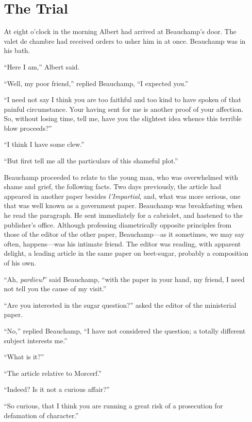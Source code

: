 \chapter{The Trial}

At eight o’clock in the morning Albert had arrived at Beauchamp’s door.
The valet de chambre had received orders to usher him in at once.
Beauchamp was in his bath.

“Here I am,” Albert said.

“Well, my poor friend,” replied Beauchamp, “I expected you.”

“I need not say I think you are too faithful and too kind to have
spoken of that painful circumstance. Your having sent for me is another
proof of your affection. So, without losing time, tell me, have you the
slightest idea whence this terrible blow proceeds?”

“I think I have some clew.”

“But first tell me all the particulars of this shameful plot.”

Beauchamp proceeded to relate to the young man, who was overwhelmed
with shame and grief, the following facts. Two days previously, the
article had appeared in another paper besides \textit{ l’Impartial}, and, what
was more serious, one that was well known as a government paper.
Beauchamp was breakfasting when he read the paragraph. He sent
immediately for a cabriolet, and hastened to the publisher’s office.
Although professing diametrically opposite principles from those of the
editor of the other paper, Beauchamp—as it sometimes, we may say often,
happens—was his intimate friend. The editor was reading, with apparent
delight, a leading article in the same paper on beet-sugar, probably a
composition of his own.

“Ah, \textit{pardieu!}” said Beauchamp, “with the paper in your hand, my
friend, I need not tell you the cause of my visit.”

“Are you interested in the sugar question?” asked the editor of the
ministerial paper.

“No,” replied Beauchamp, “I have not considered the question; a totally
different subject interests me.”

“What is it?”

“The article relative to Morcerf.”

“Indeed? Is it not a curious affair?”

“So curious, that I think you are running a great risk of a prosecution
for defamation of character.”


